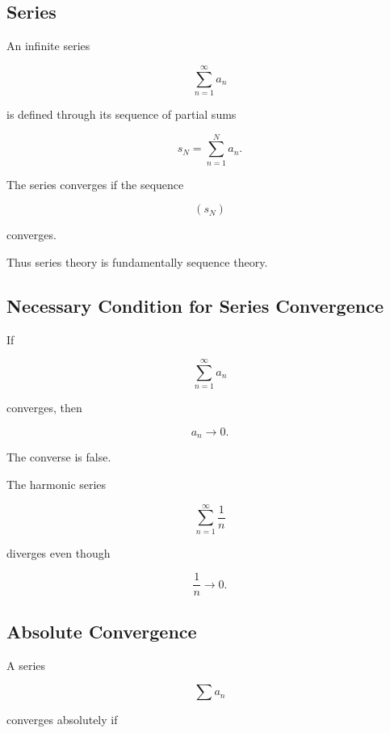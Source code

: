 \subsection{Series}
\label{subsec:series-real-analysis}

An infinite series

\[
\sum_{n=1}^{\infty}a_n
\]

is defined through its sequence of partial sums

\[
\boxed{
s_N
=
\sum_{n=1}^{N}a_n.
}
\]

The series converges if the sequence

\[
(s_N)
\]

converges.

Thus series theory is fundamentally sequence theory.

\subsection{Necessary Condition for Series Convergence}
\label{subsec:necessary-series-condition}

\begin{theorem}
If

\[
\sum_{n=1}^{\infty}a_n
\]

converges, then

\[
\boxed{
a_n\to0.
}
\]
\end{theorem}

The converse is false.

The harmonic series

\[
\sum_{n=1}^{\infty}\frac1n
\]

diverges even though

\[
\frac1n\to0.
\]

\subsection{Absolute Convergence}
\label{subsec:absolute-convergence-analysis}

A series

\[
\sum a_n
\]

converges absolutely if

